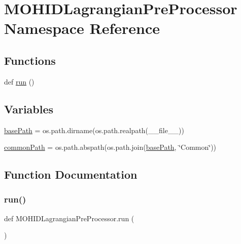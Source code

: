 \hypertarget{namespace_m_o_h_i_d_lagrangian_pre_processor}{}\section{M\+O\+H\+I\+D\+Lagrangian\+Pre\+Processor Namespace Reference}
\label{namespace_m_o_h_i_d_lagrangian_pre_processor}
\subsection*{Functions}
\begin{DoxyCompactItemize}
\item 
def \mbox{\hyperlink{namespace_m_o_h_i_d_lagrangian_pre_processor_a0e4b5abe6bc6cf76f0ed898743e538f3}{run}} ()
\end{DoxyCompactItemize}
\subsection*{Variables}
\begin{DoxyCompactItemize}
\item 
\mbox{\hyperlink{namespace_m_o_h_i_d_lagrangian_pre_processor_ac4a3b30ba4c365ff9860cd0a3fef33f9}{base\+Path}} = os.\+path.\+dirname(os.\+path.\+realpath(\+\_\+\+\_\+file\+\_\+\+\_\+))
\item 
\mbox{\hyperlink{namespace_m_o_h_i_d_lagrangian_pre_processor_a376fac9ba04258bdbbe80e19173a7244}{common\+Path}} = os.\+path.\+abspath(os.\+path.\+join(\mbox{\hyperlink{namespace_m_o_h_i_d_lagrangian_pre_processor_ac4a3b30ba4c365ff9860cd0a3fef33f9}{base\+Path}}, \char`\"{}Common\char`\"{}))
\end{DoxyCompactItemize}


\subsection{Function Documentation}
\mbox{\label{namespace_m_o_h_i_d_lagrangian_pre_processor_a0e4b5abe6bc6cf76f0ed898743e538f3}} 
\subsubsection{\texorpdfstring{run()}{run()}}
{\footnotesize\ttfamily def M\+O\+H\+I\+D\+Lagrangian\+Pre\+Processor.\+run (\begin{DoxyParamCaption}{ }\end{DoxyParamCaption})}



